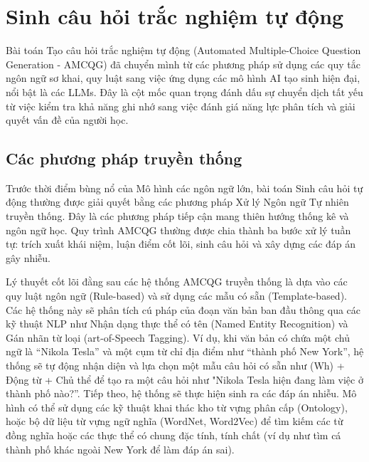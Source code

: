 \section{Sinh câu hỏi trắc nghiệm tự động}

Bài toán Tạo câu hỏi trắc nghiệm tự động (Automated Multiple-Choice Question Generation - AMCQG) đã chuyển mình từ các phương pháp sử dụng các quy tắc ngôn ngữ sơ khai, quy luật sang việc ứng dụng các mô hình AI tạo sinh hiện đại, nổi bật là các LLMs. Đây là cột mốc quan trọng đánh dấu sự chuyển dịch tất yếu từ việc kiểm tra khả năng ghi nhớ sang việc đánh giá năng lực phân tích và giải quyết vấn đề của người học.

\subsection{Các phương pháp truyền thống}

Trước thời điểm bùng nổ của Mô hình các ngôn ngữ lớn, bài toán Sinh câu hỏi tự động thường được giải quyết bằng các phương pháp Xử lý Ngôn ngữ Tự nhiên truyền thống. Đây là các phương pháp tiếp cận mang thiên hướng thống kê và ngôn ngữ học. Quy trình AMCQG thường được chia thành ba bước xử lý tuần tự: trích xuất khái niệm, luận điểm cốt lõi, sinh câu hỏi và xây dựng các đáp án gây nhiễu.

Lý thuyết cốt lõi đằng sau các hệ thống AMCQG truyền thống là dựa vào các quy luật ngôn ngữ (Rule-based) và sử dụng các mẫu có sẵn (Template-based). Các hệ thống này sẽ phân tích cú pháp của đoạn văn bản ban đầu thông qua các kỹ thuật NLP như Nhận dạng thực thể có tên (Named Entity Recognition) và Gán nhãn từ loại (art-of-Speech Tagging). Ví dụ, khi văn bản có chứa một chủ ngữ là “Nikola Tesla” và một cụm từ chỉ địa điểm như “thành phố New York”, hệ thống sẽ tự động nhận diện và lựa chọn một mẫu câu hỏi có sẵn như (Wh) + Động từ + Chủ thể để tạo ra một câu hỏi như "Nikola Tesla hiện đang làm việc ở thành phố nào?”. Tiếp theo, hệ thống sẽ thực hiện sinh ra các đáp án nhiễu. Mô hình có thể sử dụng các kỹ thuật khai thác kho từ vựng phân cấp (Ontology), hoặc bộ dữ liệu từ vựng ngữ nghĩa (WordNet, Word2Vec) để tìm kiếm các từ đồng nghĩa hoặc các thực thể có chung đặc tính, tính chất (ví dụ như tìm cá thành phố khác ngoài New York để làm đáp án sai).

